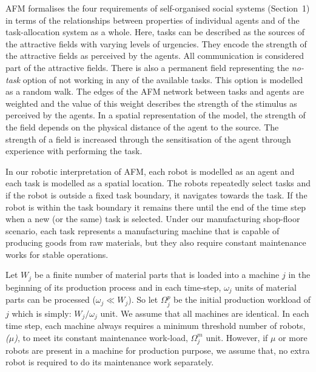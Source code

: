 \documentclass[journal]{IEEEtran}
\begin{document}
AFM formalises the four requirements of self-organised social systems (Section~1) in terms of the relationships between properties of individual agents and of the task-allocation system as a whole. Here, tasks can be described as the sources of the attractive fields with varying levels of urgencies. They encode the strength of the attractive fields as perceived by the agents. All communication is considered part of the attractive fields. There is also a permanent field representing the {\em no-task} option of not working in any of the available tasks. This option is modelled as a random walk. The edges of the AFM network  between tasks and agents are weighted and the value of this weight describes the strength of the stimulus as perceived by the agents. In a spatial representation of the model, the strength of the field depends on the physical distance of the agent to the source.  The strength of a field is increased through the sensitisation of the agent through experience with performing the task.
 
In our robotic interpretation of AFM, each robot is modelled as an agent and each task is modelled as a spatial location. The robots repeatedly select tasks and if the robot is outside a fixed task boundary, it navigates towards the task. If the robot is within the task boundary it remains there until the end of the time step when a new (or the same) task is selected. Under our manufacturing shop-floor scenario, each task represents a manufacturing machine that is capable of producing goods from raw materials, but they also require constant maintenance works for stable operations. 

Let $W_{j}$ be a finite number of material parts that is loaded into a machine $j$ in the beginning of its production process and in each time-step, $\omega_{j}$ units of material parts can be processed ($\omega_{j} \ll W_{j} $). So let $\Omega_{j}^{p}$ be the initial production workload of $j$ which is simply: $W_{j} / \omega_{j}$ unit. We assume that all machines are identical. In each time step, each machine always requires a minimum threshold number of robots, {\em ($\mu$)}, to meet its constant maintenance work-load, $\Omega_{j}^{m}$ unit. However, if $\mu$ or more robots are present in a machine for production purpose, we assume that, no extra robot is required to do its maintenance work separately. 
 
\end{document}
